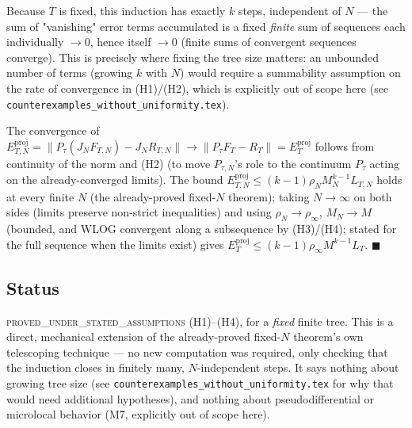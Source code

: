 Because $T$ is fixed, this induction has exactly $k$ steps, independent
of $N$ — the sum of "vanishing" error terms accumulated is a fixed
\emph{finite} sum of sequences each individually $\to 0$, hence itself
$\to 0$ (finite sums of convergent sequences converge). This is precisely
where fixing the tree size matters: an unbounded number of terms (growing
$k$ with $N$) would require a summability assumption on the rate of
convergence in (H1)/(H2), which is explicitly out of scope here (see
\texttt{counterexamples\_without\_uniformity.tex}).

The convergence of $E_{T,N}^{\mathrm{proj}} = \|P_\tau(J_N F_{T,N}) -
J_N R_{T,N}\| \to \|P_\tau F_T - R_T\| = E_T^{\mathrm{proj}}$ follows from
continuity of the norm and (H2) (to move $P_{\tau,N}$'s role to the
continuum $P_\tau$ acting on the already-converged limits). The bound
$E_{T,N}^{\mathrm{proj}} \le (k-1)\rho_N M_N^{k-1} L_{T,N}$ holds at every
finite $N$ (the already-proved fixed-$N$ theorem); taking $N\to\infty$ on
both sides (limits preserve non-strict inequalities) and using
$\rho_N\to\rho_\infty$, $M_N\to M$ (bounded, and WLOG convergent along a
subsequence by (H3)/(H4); stated for the full sequence when the limits
exist) gives $E_T^{\mathrm{proj}} \le (k-1)\rho_\infty M^{k-1}L_T$.
$\blacksquare$

\subsection*{Status}

\textsc{proved\_under\_stated\_assumptions} (H1)–(H4), for a
\emph{fixed} finite tree. This is a direct, mechanical extension of the
already-proved fixed-$N$ theorem's own telescoping technique — no new
computation was required, only checking that the induction closes in
finitely many, $N$-independent steps. It says nothing about growing tree
size (see \texttt{counterexamples\_without\_uniformity.tex} for why that
would need additional hypotheses), and nothing about pseudodifferential
or microlocal behavior (M7, explicitly out of scope here).

